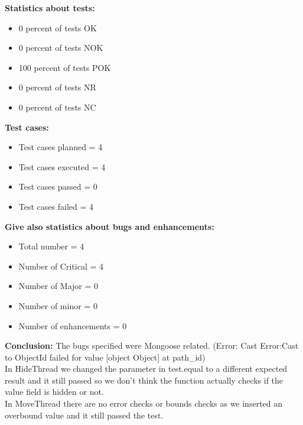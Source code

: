 \begin{flushleft}
\begin{flushleft}
\textbf{Statistics about tests:}
\begin{itemize}
  	\item  0 percent of tests OK
  	\item  0 percent of tests NOK
   	\item 100 percent of tests POK
    	\item 	0 percent of tests NR
        	\item 	0 percent of tests NC
 \end{itemize}

\textbf{Test cases:}
\begin{itemize}
  	\item Test cases planned = 4 
  	\item  Test cases executed = 4
   	\item Test cases passed = 0
    	\item Test cases failed = 4
 \end{itemize}

\textbf{Give also statistics about bugs and enhancements:}
\begin{itemize}
  	\item 	Total number = 4
  	\item  	Number of Critical = 4
   	\item 	Number of Major = 0
    	\item Number of minor = 0
      	\item Number of enhancements = 0
 \end{itemize}
 \end{flushleft}
 
\begin{flushleft}
\textbf{Conclusion:}
The bugs specified were Mongoose related. (Error: Cast Error:Cast to ObjectId failed for value [object Object] at path\_id)\\
In HideThread we changed the parameter in test.equal to a different expected result and it still passed so we don’t think the function actually checks if the value field is hidden or not.\\
In MoveThread there are no error checks or bounds checks as we inserted an overbound value and it still passed the test.
\end{flushleft}




\end{flushleft}
